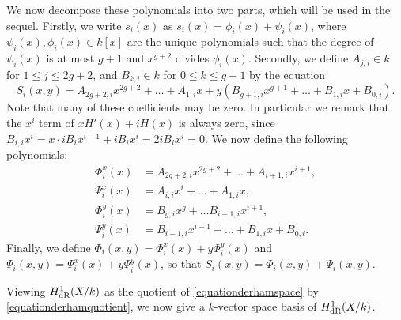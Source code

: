 We now decompose these polynomials into two parts, which will be used in the sequel.
Firstly, we write $s_i(x)$ as $s_i(x) = \phi_i(x) + \psi_i(x)$, where $\psi_i(x), \phi_i(x) \in k[x]$ are the unique polynomials such that the degree of $\psi_i (x)$ is at most $g+1$ and $x^{g+2}$ divides $\phi_i(x)$.
Secondly, we define $A_{j,i} \in k$ for $1 \leq j \leq 2g+2$, and $B_{k,i} \in k$ for $0\leq k \leq g+1$ by the equation
    \[
    S_i(x,y) = A_{2g+2,i}x^{2g+2} + \ldots + A_{1,i} x + y(B_{g+1,i} x^{g+1} + \ldots + B_{1,i} x + B_{0,i}).
    \]
Note that many of these coefficients may be zero.
In particular we remark that the $x^i$ term of $xH'(x) + iH(x)$ is always zero, since $B_{i,i}x^i = x \cdot iB_ix^{i-1} + iB_i x^i = 2iB_ix^i = 0$.
We now define the following polynomials:
    \begin{equation}\label{equationsplittingphiandpsi}
    \begin{split}
    \Phi_i^x(x) & =  A_{2g+2, i}x^{2g+2} + \ldots + A_{i+1, i}x^{i+1}, \\
    \Psi_i^x(x) & =  A_{i,i}x^i + \ldots + A_{1,i}x, \\
    \Phi_i^y(x) & =  B_{g,i}x^g + \ldots B_{i+1,i}x^{i+1}, \\
    \Psi_i^y(x) & =  B_{i-1,i}x^{i-1} + \ldots + B_{1,i}x + B_{0,i}.
    \end{split}
    \end{equation}
Finally, we define $\Phi_i(x,y) = \Phi_i^x(x) + y \Phi^y_i(x)$ and $\Psi_i(x,y) = \Psi_i^x(x) + y \Psi_i^y(x)$, so that $S_i(x,y) = \Phi_i(x,y) + \Psi_i(x,y)$.

Viewing $H_{\text {dR}}^1(X/k)$ as the quotient of \eqref{equationderhamspace} by \eqref{equationderhamquotient}, we now give a $k$-vector space basis of $H_{\text {dR}}^1(X/k)$.

